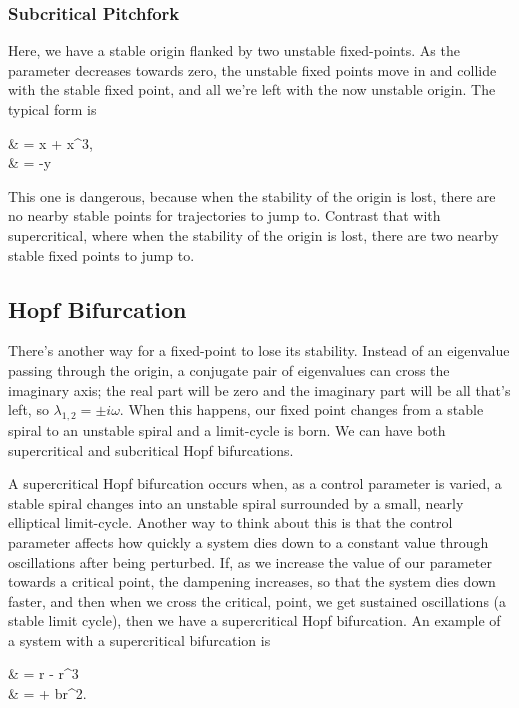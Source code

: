 \documentclass{article}
\begin{document}
\subsubsection{Subcritical Pitchfork}
Here, we have a stable origin flanked by two unstable \@{fixed-points}. As the parameter decreases towards zero, the unstable fixed points move in and collide with the stable fixed point, and all we're left with the now unstable origin. The typical form is

\bal
{} & = \mu x + x^3, \\
 & = -y
\eal

This one is dangerous, because when the stability of the origin is lost, there are no nearby stable points for \@{trajectories} to jump to. Contrast that with supercritical, where when the stability of the origin is lost, there are two nearby stable fixed points to jump to.

\subsection{Hopf Bifurcation}

There's another way for a \@{fixed-point} to lose its stability. Instead of an eigenvalue passing through the origin, a conjugate pair of eigenvalues can cross the imaginary axis; the real part will be zero and the imaginary part will be all that's left, so $\lambda_{1,2} = \pm i \omega.$ When this happens, our fixed point changes from a stable spiral to an unstable spiral and a \@{limit-cycle} is born. We can have both supercritical and subcritical Hopf bifurcations.

A supercritical Hopf bifurcation occurs when, as a control parameter is varied, a stable spiral changes into an unstable spiral surrounded by a small, nearly elliptical \@{limit-cycle}. Another way to think about this is that the control parameter affects how quickly a system dies down to a constant value through oscillations after being perturbed. If, as we increase the value of our parameter towards a critical point, the dampening increases, so that the system dies down faster, and then when we cross the critical, point, we get sustained oscillations (a stable limit cycle), then we have a supercritical Hopf bifurcation. An example of a system with a supercritical bifurcation is

\bal
{} & = \mu r - r^3 \\
\dot{\theta} & = \omega + br^2.  \\
\eal
\end{document}

